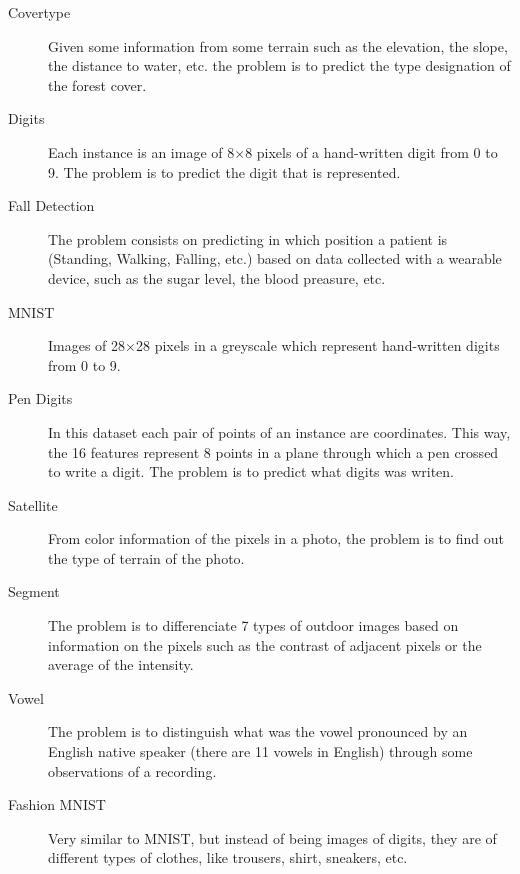 \begin{pre-delivery}
  \begin{description}
    \item[Covertype] Given some information from some terrain such as the
    elevation, the slope, the distance to water, etc. the problem is to predict
    the type designation of the forest cover.
    \item[Digits] Each instance is an image of 8$\times$8 pixels of a
    hand-written digit from 0 to 9. The problem is to predict the
    digit that is represented.
    \item[Fall Detection] The problem consists on predicting in which position
    a patient is (Standing, Walking, Falling, etc.) based on data collected
    with a wearable device, such as the sugar level, the blood preasure, etc.
    \item[MNIST] Images of 28$\times$28 pixels in a greyscale which represent
    hand-written digits from 0 to 9.
    \item[Pen Digits] In this dataset each pair of points of an instance are
    coordinates. This way, the 16 features represent 8 points in a plane through
    which a pen crossed to write a digit. The problem is to predict what
    digits was writen.
    \item[Satellite] From color information of the pixels in a photo, the problem
    is to find out the type of terrain of the photo.
    \item[Segment] The problem is to differenciate 7 types of outdoor images
    based on information on the pixels such as the contrast of adjacent pixels
    or the average of the intensity.
    \item[Vowel] The problem is to distinguish what was the vowel pronounced
    by an English native speaker (there are 11 vowels in English) through some
    observations of a recording.
    \item[Fashion MNIST] Very similar to MNIST, but instead of being images
    of digits, they are of different types of clothes, like trousers, shirt,
    sneakers, etc.
  \end{description}
\end{pre-delivery}
